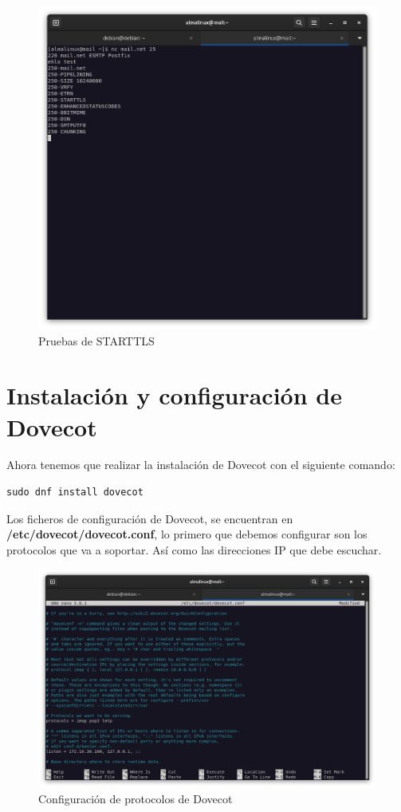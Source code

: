 \begin{figure}[H]
	\centering
	\includegraphics[scale=0.30]{10}
	\caption{Pruebas de STARTTLS}
\end{figure}

\newpage 
\section{Instalación y configuración de Dovecot}

Ahora tenemos que realizar la instalación de Dovecot con el siguiente comando:

\begin{lstlisting}[style=mybash]
sudo dnf install dovecot
\end{lstlisting}

Los ficheros de configuración de Dovecot, se encuentran en \textbf{/etc/dovecot/dovecot.conf}, lo primero que debemos configurar son los protocolos que va a soportar. Así como las direcciones IP que debe escuchar.

\begin{figure}[H]
	\centering
	\includegraphics[scale=0.30]{11}
	\caption{Configuración de protocolos de Dovecot}
\end{figure}


